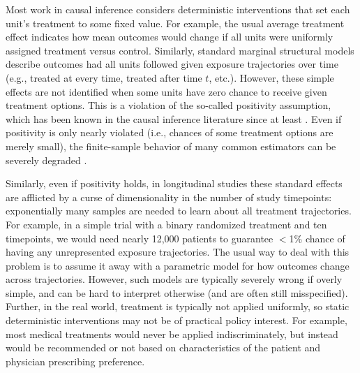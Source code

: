 \documentclass[12pt]{article}
\theoremstyle{remark}
\begin{document}
Most work in causal inference considers deterministic interventions that set each unit's treatment to some fixed value. For example, the usual average treatment effect indicates how mean outcomes would change if all units were uniformly assigned treatment versus control. Similarly, standard marginal structural models \autocite{robins2000marginal} describe outcomes had all units followed given exposure trajectories over time (e.g., treated at every time, treated after time $t$, etc.). However, these simple effects are not identified when some units have zero chance to receive given treatment options. This is a violation of the so-called positivity assumption, which has been known in the causal inference literature since at least \textcite{rosenbaum1983central}. Even if positivity is only nearly violated (i.e., chances of some treatment options are merely small), the finite-sample behavior of many common estimators can be severely degraded \autocite{kang2007demystifying, moore2012causal}. 

Similarly, even if positivity holds, in longitudinal studies these standard effects are afflicted by a curse of dimensionality in the number of study timepoints: exponentially many samples are needed to learn about all treatment trajectories. For example, in a simple trial with a binary randomized treatment and ten timepoints, we would need %
nearly 12,000 patients to guarantee $<$1\% chance of having any unrepresented exposure trajectories. The usual way to deal with this problem is to assume it away with a parametric model for how outcomes change across trajectories. However, such models are typically severely wrong if overly simple, and can be hard to interpret otherwise (and are often still misspecified). Further, in the real world, treatment is typically not applied uniformly, so static deterministic interventions may not be of practical policy interest. For example, most medical treatments would never be applied indiscriminately, but instead would be recommended or not based on characteristics of the patient and physician prescribing preference. 
\end{document}
